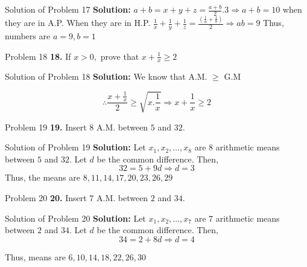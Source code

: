 \documentclass[aspectratio=1610,8pt]{beamer}
\begin{document}
\begin{frame}{Solution of Problem 17}
  \textbf{Solution:} $a + b = x + y + z = \frac{a + b}{2}.3 \Rightarrow a + b =
  10$ when they are in A.P.
  \linebreak\linebreak
  When they are in H.P. $\frac{1}{x} + \frac{1}{y} + \frac{1}{z} =
  \frac{\left(\frac{1}{a} + \frac{1}{b}\right)}{2} \Rightarrow ab = 9$
  \linebreak\linebreak
  Thus, numbers are $a = 9, b = 1$
\end{frame}
\begin{frame}{Problem 18}
  \textbf{18.} If $x > 0,$ prove that $x + \frac{1}{x} \geq 2$
\end{frame}
\begin{frame}{Solution of Problem 18}
  \textbf{Solution:} We know that A.M. $\geq$ G.M

  $$\therefore \frac{x + \frac{1}{x}}{2} \geq \sqrt{x.\frac{1}{x}} \Rightarrow x
  + \frac{1}{x} \geq 2$$
\end{frame}
\begin{frame}{Problem 19}
  \textbf{19.} Insert $8$ A.M. between $5$ and $32.$
\end{frame}
\begin{frame}{Solution of Problem 19}
  \textbf{Solution:} Let $x_1, x_2, \ldots, x_8$ are $8$ arithmetic means
  between $5$ and $32.$ Let $d$ be the common difference. Then,
  $$32 = 5 + 9d \Rightarrow d = 3$$
  Thus, the means are $8, 11, 14, 17, 20, 23, 26, 29$
\end{frame}
\begin{frame}{Problem 20}
  \textbf{20.} Insert $7$ A.M. between $2$ and $34.$
\end{frame}
\begin{frame}{Solution of Problem 20}
  \textbf{Solution:} Let $x_1, x_2, \ldots, x_7$ are $7$ arithmetic means
  between $2$ and $34.$ Let $d$ be the common difference. Then,
  $$34 = 2 + 8d \Rightarrow d = 4$$

  Thus, means are $6, 10, 14, 18, 22, 26, 30$
\end{frame}
\end{document}
